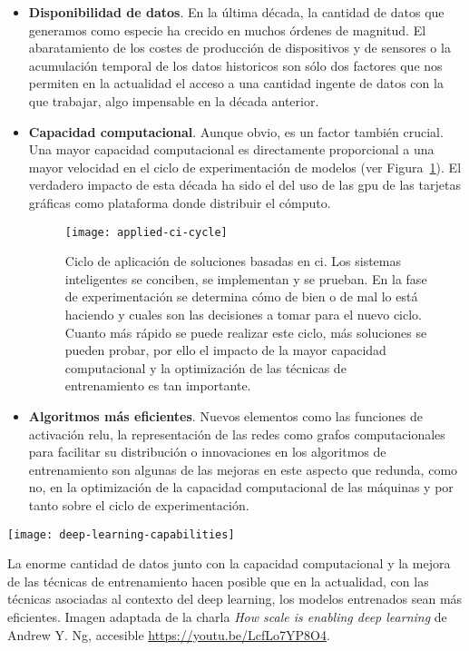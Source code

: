 \begin{itemize}
	\item \textbf{Disponibilidad de datos}. En la última década, la cantidad de datos que generamos como especie ha crecido en muchos órdenes de magnitud. El abaratamiento de los costes de producción de dispositivos y de sensores o la acumulación temporal de los datos historicos son sólo dos factores que nos permiten en la actualidad el acceso a una cantidad ingente de datos con la que trabajar, algo impensable en la década anterior.
	\item \textbf{Capacidad computacional}. Aunque obvio, es un factor también crucial. Una mayor capacidad computacional es directamente proporcional a una mayor velocidad en el ciclo de experimentación de modelos (ver Figura~\ref{fig:applied-ci-cycle}). El verdadero impacto de esta década ha sido el del uso de las \gls{gpu} de las tarjetas gráficas como plataforma donde distribuir el cómputo.

\begin{figure}
	\centering
	\texttt{[image: applied-ci-cycle]}
	\caption[Ciclo de aplicación de soluciones basadas en ]{Ciclo de aplicación de soluciones basadas en \acrlong{ci}. Los sistemas inteligentes se conciben, se implementan y se prueban. En la fase de experimentación se determina cómo de bien o de mal lo está haciendo y cuales son las decisiones a tomar para el nuevo ciclo. Cuanto más rápido se puede realizar este ciclo, más soluciones se pueden probar, por ello el impacto de la mayor capacidad computacional y la optimización de las técnicas de entrenamiento es tan importante.}
	\label{fig:applied-ci-cycle}
\end{figure}

	\item \textbf{Algoritmos más eficientes}. Nuevos elementos como las funciones de activación \acrshort{relu}, la representación de las redes como grafos computacionales para facilitar su distribución o innovaciones en los algoritmos de entrenamiento son algunas de las mejoras en este aspecto que redunda, como no, en la optimización de la capacidad computacional de las máquinas y por tanto sobre el ciclo de experimentación.
\end{itemize}

\begin{marginfigure}
	\texttt{[image: deep-learning-capabilities]}
	\caption[Capacidad de los modelos en función de la cantidad de datos]{La enorme cantidad de datos junto con la capacidad computacional y la mejora de las técnicas de entrenamiento hacen posible que en la actualidad, con las técnicas asociadas al contexto del deep learning, los modelos entrenados sean más eficientes. Imagen adaptada de la charla \textit{How scale is enabling deep learning} de Andrew Y. Ng, accesible \url{https://youtu.be/LcfLo7YP8O4}.}
	\label{fig:deep-learning-capabilities}
\end{marginfigure}

